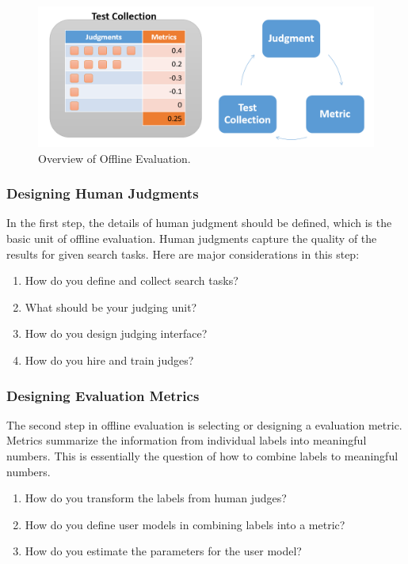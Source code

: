 \documentclass[openany]{now} %
\begin{document}
\begin{figure}
	\begin{center}
		\includegraphics[scale=0.4]{images/offline_evaluation_overview}
		\caption{Overview of Offline Evaluation.} 
		\label{fig:offline_evaluation_overview}
	\end{center}
\end{figure}

\subsubsection{Designing Human Judgments}

In the first step, the details of human judgment should be defined, which is the basic unit of offline evaluation. Human judgments capture the quality of the results for given search tasks. Here are major considerations in this step:

\begin{enumerate}
	\item How do you define and collect search tasks?
	\item What should be your judging unit?
	\item How do you design judging interface?
	\item How do you hire and train judges?
\end{enumerate}

\subsubsection{Designing Evaluation Metrics}

The second step in offline evaluation is selecting or designing a  evaluation metric. Metrics summarize the information from individual labels into meaningful numbers. This is essentially the question of how to combine labels to meaningful numbers.

\begin{enumerate}
	\item How do you transform the labels from human judges?
	\item How do you define user models in combining labels into a metric?
	\item How do you estimate the parameters for the user model?
\end{enumerate}
\end{document}
